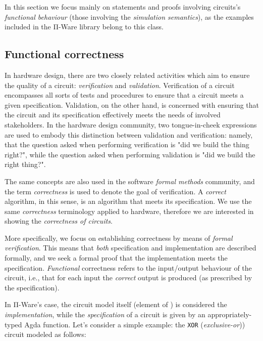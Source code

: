         In this section we focus mainly on statements and proofs involving circuits's
        \emph{functional behaviour} (those involving the \emph{simulation semantics}),
        as the examples included in the Π-Ware library belong to this class.


        \subsection{Functional correctness}
        \label{subsec:functional-correctness}
            In hardware design, there are two closely related activities which aim to ensure the
            quality of a circuit: \emph{verification} and \emph{validation}.
            Verification of a circuit encompasses all sorts of tests and procedures to ensure that
            a circuit meets a given specification.
            Validation, on the other hand, is concerned with ensuring that the circuit and
            its specification effectively meets the needs of involved stakeholders.
            In the hardware design community, two tongue-in-cheek expressions are used to embody
            this distinction between validation and verification: namely, that the question asked
            when performing verification is "did we build the thing right?",
            while the question asked when performing validation is "did we build the right thing?".

            The same concepts are also used in the software \emph{formal methods} community,
            and the term \emph{correctness} is used to denote the goal of verification.
            A \emph{correct} algorithm, in this sense, is an algorithm that meets its specification.
            We use the same \emph{correctness} terminology applied to hardware, therefore
            we are interested in showing the \emph{correctness of circuits}.

            More specifically, we focus on establishing correctness by means of \emph{formal verification}.
            This means that \emph{both} specification and implementation are described formally,
            and we seek a formal proof that the implementation meets the specification.
            \emph{Functional} correctness refers to the input/output behaviour of the circuit, i.e.,
            that for each input the \emph{correct} output is produced (as prescribed by the specification).

            In Π-Ware's case, the circuit model itself (element of ) is considered the \emph{implementation},
            while the \emph{specification} of a circuit is given by an appropriately-typed Agda function.
            Let's consider a simple example: the \texttt{XOR} (\emph{exclusive-or})) circuit modeled as follows:

